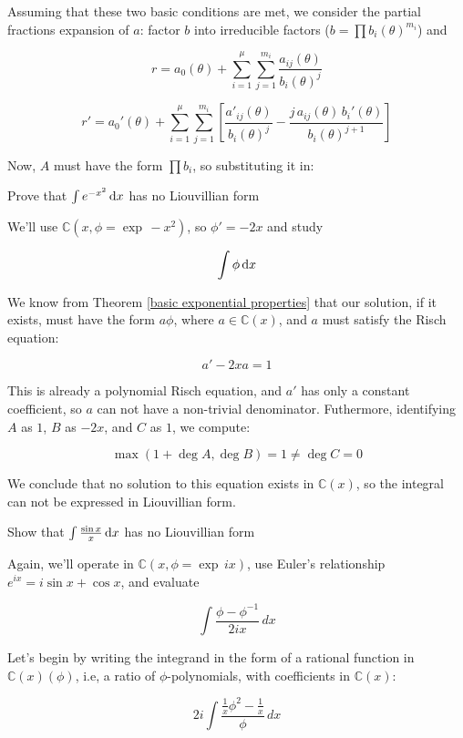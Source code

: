 Assuming that these two basic conditions are met, we consider 
the partial fractions expansion of $a$:
factor $b$ into irreducible factors ($b=\prod b_i(\theta)^{m_i}$) and

$$r = a_0(\theta) + \sum_{i=1}^\mu \sum_{j=1}^{m_i} \frac{a_{ij}(\theta)}{b_i(\theta)^j}$$

$$r' = a_0'(\theta) + \sum_{i=1}^\mu \sum_{j=1}^{m_i} \left[
\frac{a'_{ij}(\theta)}{b_i(\theta)^j} - \frac{j\, a_{ij}(\theta)\,
b_i'(\theta)}{b_i(\theta)^{j+1}} \right]$$

Now, $A$ must have the form $\prod b_i$, so substituting it in:


\example Prove that $\int e^{-x^2}\, {\rm d}x$ has no Liouvillian form

We'll use ${\mathbb C}(x, \phi = \exp\, -x^2)$, so $\phi' = -2x$ and
study

$$\int \phi \, {\rm d}x$$

We know from Theorem \ref{basic exponential properties} that our
solution, if it exists, must have the form $a\phi$, where $a \in
{\mathbb C}(x)$, and $a$ must satisfy the Risch equation:

$$a' - 2x a = 1$$

This is already a polynomial Risch equation, and $a'$ has only
a constant coefficient, so $a$ can not have a non-trivial denominator.
Futhermore, identifying $A$ as $1$, $B$ as $-2x$, and $C$ as $1$, we compute:

$$\max(1 + \deg A, \deg B) = 1 \ne \deg C = 0$$

We conclude that no solution to this equation exists in ${\mathbb C}(x)$,
so the integral can not be expressed in Liouvillian form.

\endexample


\example Show that $\int \frac{\sin x}{x} \, {\rm d}x$ has no Liouvillian form

Again, we'll operate in ${\mathbb C}(x, \phi = \exp \,ix)$, use
Euler's relationship $e^{ix}=i\sin x + \cos x$, and evaluate

$$\int \frac{\phi - \phi^{-1}}{2ix} \,dx$$

Let's begin by writing the integrand in the form of a rational
function in ${\mathbb C}(x)(\phi)$, i.e, a ratio
of $\phi$-polynomials, with coefficients in ${\mathbb C}(x)$:

$$2i \int \frac{\frac{1}{x}\phi^2 - \frac{1}{x}}{\phi} \,dx$$

